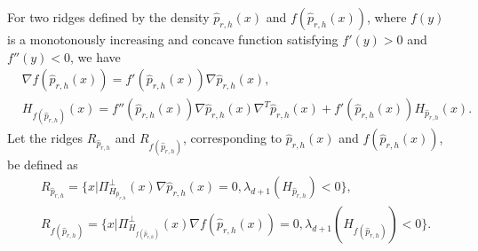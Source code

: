 \documentclass[aos,preprint]{imsart}
\theoremstyle{remark}
\begin{document}
For two ridges defined by the density $\hat{p}_{r, h}(x)$ and $f(\hat{p}_{r, h}(x))$, where $f(y)$ is a monotonously increasing and  concave function satisfying $f'(y)>0$ and $f''(y)<0$, we have 
\begin{equation}\label{derivatef}
\begin{aligned}
&\nabla f(\hat{p}_{r,h}(x)) = f'(\hat{p}_{r,h}(x)) \nabla \hat{p}_{r,h}(x),\\
&H_{f(\hat{p}_{r,h})}(x) = f''(\hat{p}_{r,h}(x)) \nabla \hat{p}_{r,h}(x) \nabla^T \hat{p}_{r,h}(x) + f'(\hat{p}_{r,h}(x)) H_{\hat{p}_{r,h}}(x).
\end{aligned}
\end{equation}
Let the ridges $R_{\hat{p}_{r,h}}$ and $R_{f(\hat{p}_{r,h})}$, corresponding to $\hat{p}_{r,h}(x)$ and $f(\hat{p}_{r,h}(x))$, be defined as
\[
\begin{aligned}
&R_{\hat{p}_{r,h}} = \{x | \Pi_{H_{\hat{p}_{r,h}}}^{\perp} (x) \nabla \hat{p}_{r,h}(x) = 0, \lambda_{d+1}(H_{\hat{p}_{r,h}})<0\}, \\
&R_{f(\hat{p}_{r,h})} = \{x | \Pi_{H_{f(\hat{p}_{r,h})}}^{\perp} (x) \nabla f(\hat{p}_{r,h}(x)) = 0,\lambda_{d+1}(H_{f(\hat{p}_{r,h})})<0\}.
\end{aligned}
\]
\end{document}
